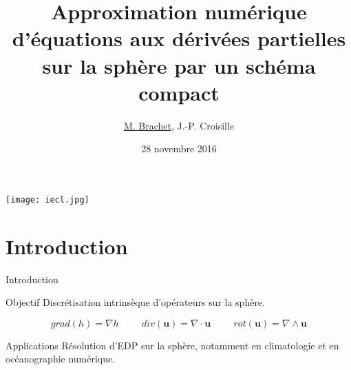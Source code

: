 \documentclass[11pt]{beamer}
\author[Matthieu Brachet]{\underline{M. Brachet}, J.-P. Croisille}
\title[Schémas compacts sur la sphère]{Approximation numérique d'équations aux dérivées partielles sur la sphère par un schéma compact}
\institute[IECL]{Institut Elie Cartan de Lorraine (Metz)}
\date{28 novembre 2016}
\begin{document}
\begin{frame}
\titlepage
\texttt{[image: iecl.jpg]}
\end{frame}

\section*{Introduction}

\begin{frame}{Introduction}
\begin{block}{Objectif}
Discrétisation intrinsèque d'opérateurs sur la sphère.
\end{block}

\begin{equation*}
grad(h) = \nabla h \hspace{1cm} div(\mathbf{u}) = \nabla \cdot \mathbf{u} \hspace{1cm} rot(\mathbf{u}) = \nabla \wedge \mathbf{u}
\end{equation*}

\pause
\begin{block}{Applications}
Résolution d'EDP sur la sphère, notamment en climatologie et en océanographie numérique.
\end{block}

\end{frame}
\end{document}
